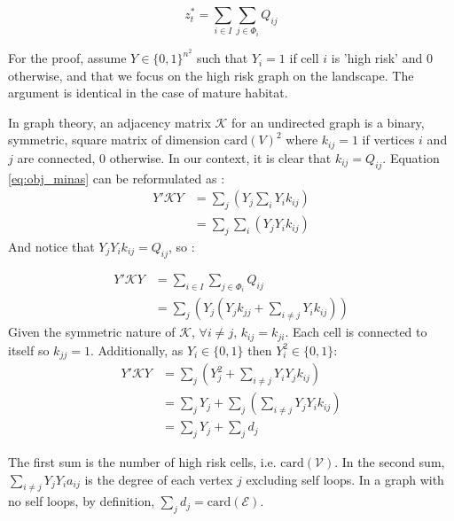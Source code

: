 \begin{equation}
    z^*_t = \sum_{i \in I}\sum_{j \in \Phi_i}Q_{ij}
    \label{eq:obj_minas}
\end{equation}

For the proof, assume $Y \in \{0,1\}^{n^2}$ such that $Y_i=1$ if cell $i$ is 'high risk' and $0$ otherwise, and that we focus on the high risk graph on the landscape. The argument is identical in the case of mature habitat. 

In graph theory, an adjacency matrix $\mathcal{K}$ for an undirected graph is a binary, symmetric, square matrix of dimension $\mathrm{card}(V)^2$ where $k_{ij}=1$ if vertices $i$ and $j$ are connected, $0$ otherwise. In our context, it is clear that $k_{ij}=Q_{ij}$. Equation \ref{eq:obj_minas} can be reformulated as : 
\begin{align*}
    Y' \mathcal{K} Y &= \sum_j\left( Y_j \sum_i Y_i k_{ij}\right)\\
    &= \sum_j \sum_i \left( Y_j Y_i k_{ij}\right)
\end{align*}
And notice that $Y_j Y_i k_{ij} = Q_{ij}$, so :

\begin{align*}
    Y' \mathcal{K} Y &=\sum_{i \in I}\sum_{j \in \Phi_i}Q_{ij}\\
					 &= \sum_j\left( Y_j \left( Y_j k_{jj} + \sum_{i \neq j}Y_i k_{ij}\right)\right)
\end{align*}
Given the symmetric nature of $\mathcal{K}$, $\forall i \neq j$, $k_{ij}=k_{ji}$. Each cell is connected to itself so $k_{jj}=1$. Additionally, as $Y_i\in\{0,1\}$ then $Y_i^2 \in \{0,1\}$:
\begin{align*}
    Y'\mathcal{K} Y & =\sum_j \left(Y_j^2 + \sum_{i\neq j}Y_i Y_j k_{ij}\right)\\ 
          & = \sum_j Y_j + \sum_{j} \left(\sum_{i \neq j }Y_j Y_i k_{ij}\right)   \\
          & = \sum_j Y_j + \sum_{j} d_{j}
\end{align*}

The first sum is the number of high risk cells, i.e. $\mathrm{card}(\mathcal{V})$. 
In the second sum, $\sum_{i \neq j} Y_j Y_i a_{ij}$ is the degree of each vertex $j$ excluding self loops. In a graph with no self loops, by definition, $\sum_{j} d_j = \mathrm{card}(\mathcal{E})$.

